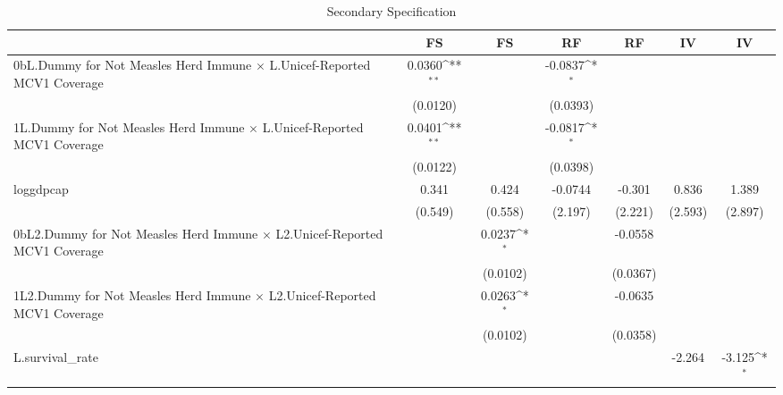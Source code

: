 \begin{table}[htbp]\centering
\def\sym#1{\ifmmode^{#1}\else\(^{#1}\)\fi}
\caption{Secondary Specification}
\begin{tabular}{l*{6}{c}}
\toprule
                &\multicolumn{1}{c}{FS}&\multicolumn{1}{c}{FS}&\multicolumn{1}{c}{RF}&\multicolumn{1}{c}{RF}&\multicolumn{1}{c}{IV}&\multicolumn{1}{c}{IV}\\
\midrule
0bL.Dummy for Not Measles Herd Immune $\times$ L.Unicef-Reported MCV1 Coverage&   0.0360\sym{**} &                  &  -0.0837\sym{*}  &                  &                  &                  \\
                & (0.0120)         &                  & (0.0393)         &                  &                  &                  \\
\addlinespace
1L.Dummy for Not Measles Herd Immune $\times$ L.Unicef-Reported MCV1 Coverage&   0.0401\sym{**} &                  &  -0.0817\sym{*}  &                  &                  &                  \\
                & (0.0122)         &                  & (0.0398)         &                  &                  &                  \\
\addlinespace
loggdpcap       &    0.341         &    0.424         &  -0.0744         &   -0.301         &    0.836         &    1.389         \\
                &  (0.549)         &  (0.558)         &  (2.197)         &  (2.221)         &  (2.593)         &  (2.897)         \\
\addlinespace
0bL2.Dummy for Not Measles Herd Immune $\times$ L2.Unicef-Reported MCV1 Coverage&                  &   0.0237\sym{*}  &                  &  -0.0558         &                  &                  \\
                &                  & (0.0102)         &                  & (0.0367)         &                  &                  \\
\addlinespace
1L2.Dummy for Not Measles Herd Immune $\times$ L2.Unicef-Reported MCV1 Coverage&                  &   0.0263\sym{*}  &                  &  -0.0635         &                  &                  \\
                &                  & (0.0102)         &                  & (0.0358)         &                  &                  \\
\addlinespace
L.survival\_rate &                  &                  &                  &                  &   -2.264         &   -3.125\sym{*}  \\

\end{tabular}
\end{table}
